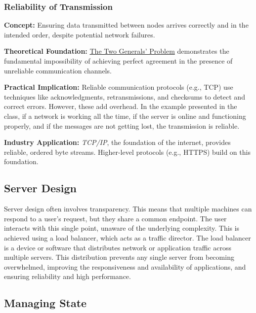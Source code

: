 \subsubsection{Reliability of Transmission}
\textbf{Concept:} Ensuring data transmitted between nodes arrives correctly and in the intended order, despite potential network failures.

\textbf{Theoretical Foundation:}  \href{https://en.wikipedia.org/wiki/Two_Generals\%27_Problem}{The Two Generals' Problem} demonstrates the fundamental impossibility of achieving perfect agreement in the presence of unreliable communication channels.

\textbf{Practical Implication:} Reliable communication protocols (e.g., TCP) use techniques like acknowledgments, retransmissions, and checksums to detect and correct errors.  However, these add overhead. In the example presented in the class, if a network is working all the time, if the server is online and functioning properly, and if the messages are not getting lost, the transmission is reliable.

\textbf{Industry Application:} \textit{TCP/IP}, the foundation of the internet, provides reliable, ordered byte streams.  Higher-level protocols (e.g., HTTPS) build on this foundation.


\subsection{Server Design}

Server design often involves transparency.  This means that multiple machines can respond to a user's request, but they share a common endpoint. The user interacts with this single point, unaware of the underlying complexity. This is achieved using a load balancer, which acts as a traffic director. The load balancer is a device or software that distributes network or application traffic across multiple servers.  This distribution prevents any single server from becoming overwhelmed, improving the responsiveness and availability of applications, and ensuring reliability and high performance.


\subsection{Managing State}

